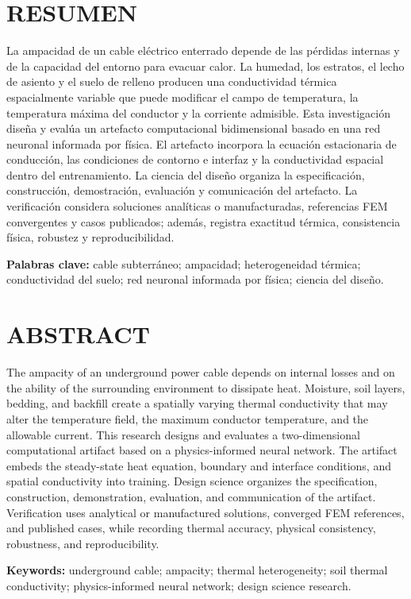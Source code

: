 \chapter*{RESUMEN}

La ampacidad de un cable eléctrico enterrado depende de las pérdidas internas y de la capacidad del entorno para evacuar calor. La humedad, los estratos, el lecho de asiento y el suelo de relleno producen una conductividad térmica espacialmente variable que puede modificar el campo de temperatura, la temperatura máxima del conductor y la corriente admisible. Esta investigación diseña y evalúa un artefacto computacional bidimensional basado en una red neuronal informada por física. El artefacto incorpora la ecuación estacionaria de conducción, las condiciones de contorno e interfaz y la conductividad espacial dentro del entrenamiento. La ciencia del diseño organiza la especificación, construcción, demostración, evaluación y comunicación del artefacto. La verificación considera soluciones analíticas o manufacturadas, referencias FEM convergentes y casos publicados; además, registra exactitud térmica, consistencia física, robustez y reproducibilidad.


\noindent\textbf{Palabras clave:} cable subterráneo; ampacidad; heterogeneidad térmica; conductividad del suelo; red neuronal informada por física; ciencia del diseño.

\chapter*{ABSTRACT}

The ampacity of an underground power cable depends on internal losses and on the ability of the surrounding environment to dissipate heat. Moisture, soil layers, bedding, and backfill create a spatially varying thermal conductivity that may alter the temperature field, the maximum conductor temperature, and the allowable current. This research designs and evaluates a two-dimensional computational artifact based on a physics-informed neural network. The artifact embeds the steady-state heat equation, boundary and interface conditions, and spatial conductivity into training. Design science organizes the specification, construction, demonstration, evaluation, and communication of the artifact. Verification uses analytical or manufactured solutions, converged FEM references, and published cases, while recording thermal accuracy, physical consistency, robustness, and reproducibility.


\noindent\textbf{Keywords:} underground cable; ampacity; thermal heterogeneity; soil thermal conductivity; physics-informed neural network; design science research.

